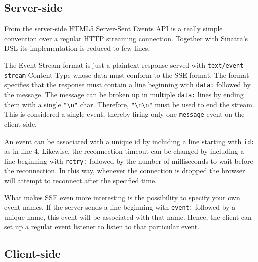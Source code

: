 \subsection*{Server-side}

From the server-side HTML5 Server-Sent Events API is a really simple convention over a regular HTTP streaming connection. Together with Sinatra's DSL its implementation is reduced to few lines.


The Event Stream format is just a plaintext response served with \texttt{text/event-stream} Content-Type whose data must conform to the SSE format. The format specifies that the response must contain a line beginning with \texttt{data:} followed by the message. The message can be broken up in multiple \texttt{data:} lines by ending them with a single \texttt{"\texttt{\textbackslash n}"} char. Therefore, \texttt{"\textbackslash n\textbackslash n"} must be used to end the stream. This is considered a single event, thereby firing only one \texttt{message} event on the client-side.

An event can be associated with a unique id by including a line starting with \texttt{id:} as in line 4. Likewise, the reconnection-timeout can be changed by including a line beginning with \texttt{retry:} followed by the number of milliseconds to wait before the reconnection. In this way, whenever the connection is dropped the browser will attempt to reconnect after the specified time.

What makes SSE even more interesting is the possibility to specify your own event names. If the server sends a line beginning with \texttt{event:} followed by a unique name, this event will be associated with that name. Hence, the client can set up a regular event listener to listen to that particular event.

\subsection*{Client-side}

